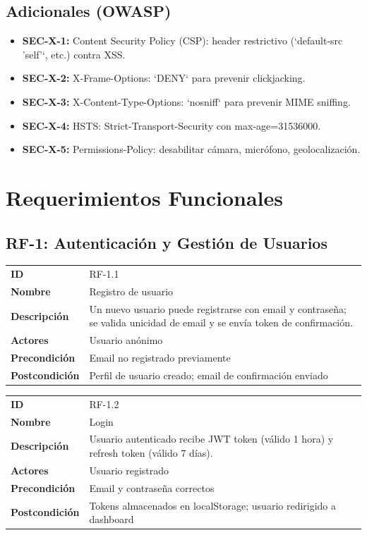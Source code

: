 \documentclass[12pt,a4paper,oneside]{article}
\begin{document}
\subsection{Adicionales (OWASP)}

\begin{itemize}[label=\textcolor{warning}{[SEC-X]}]
  \item \textbf{SEC-X-1:} Content Security Policy (CSP): header restrictivo (`default-src 'self'`, etc.) contra XSS.
  \item \textbf{SEC-X-2:} X-Frame-Options: `DENY` para prevenir clickjacking.
  \item \textbf{SEC-X-3:} X-Content-Type-Options: `nosniff` para prevenir MIME sniffing.
  \item \textbf{SEC-X-4:} HSTS: Strict-Transport-Security con max-age=31536000.
  \item \textbf{SEC-X-5:} Permissions-Policy: desabilitar cámara, micrófono, geolocalización.
\end{itemize}

\section{Requerimientos Funcionales}

\subsection{RF-1: Autenticación y Gestión de Usuarios}

\begin{tabularx}{\linewidth}{|l|X|}
\hline
\textbf{ID} & RF-1.1 \\
\textbf{Nombre} & Registro de usuario \\
\textbf{Descripción} & Un nuevo usuario puede registrarse con email y contraseña; se valida unicidad de email y se envía token de confirmación. \\
\textbf{Actores} & Usuario anónimo \\
\textbf{Precondición} & Email no registrado previamente \\
\textbf{Postcondición} & Perfil de usuario creado; email de confirmación enviado \\
\hline
\end{tabularx}

\begin{tabularx}{\linewidth}{|l|X|}
\hline
\textbf{ID} & RF-1.2 \\
\textbf{Nombre} & Login \\
\textbf{Descripción} & Usuario autenticado recibe JWT token (válido 1 hora) y refresh token (válido 7 días). \\
\textbf{Actores} & Usuario registrado \\
\textbf{Precondición} & Email y contraseña correctos \\
\textbf{Postcondición} & Tokens almacenados en localStorage; usuario redirigido a dashboard \\
\hline
\end{tabularx}
\end{document}
